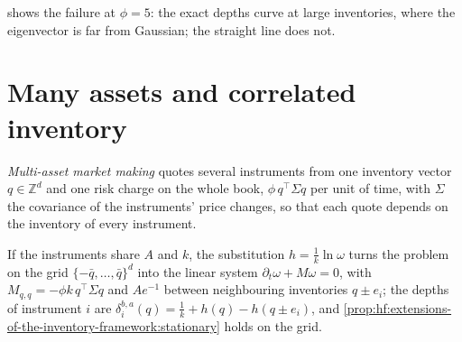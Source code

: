  shows the failure at $\phi=5$: the exact depths curve at large inventories, where the
eigenvector is far from Gaussian; the straight line does not.

\begin{omfigure}

\label{fig:hf:extensions-of-the-inventory-framework:closed}
\end{omfigure}

\section{Many assets and correlated inventory}

\begin{definition}\label{def:hf:extensions-of-the-inventory-framework:multi}
\emph{Multi-asset market making} quotes several instruments from one inventory vector $q\in\mathbb Z^d$ and one
risk charge on the whole book, $\phi\,q^\top\Sigma q$ per unit of time, with $\Sigma$ the covariance of the instruments' price changes, so that each
quote depends on the inventory of every instrument.
\end{definition}

\begin{proposition}\label{prop:hf:extensions-of-the-inventory-framework:multi}
If the instruments share $A$ and $k$, the substitution $h=\tfrac1k\ln\omega$ turns the problem on the grid $\{-\bar q,\dots,\bar q\}^d$ into the
linear system $\partial_t\omega+M\omega=0$, with $M_{q,q}=-\phi k\,q^\top\Sigma q$ and $Ae^{-1}$ between neighbouring inventories $q\pm e_i$; the
depths of instrument $i$ are $\delta^{b,a}_i(q)=\tfrac1k+h(q)-h(q\pm e_i)$, and \cref{prop:hf:extensions-of-the-inventory-framework:stationary}
holds on the grid.
\end{proposition}

